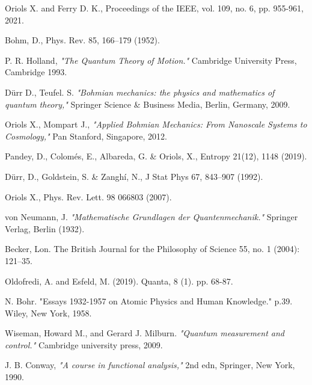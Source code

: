 \documentclass[11pt, a4paper]{article} %
\begin{document}
\newpage
\twocolumn
\begin{thebibliography}{1}
{\footnotesize 

Oriols X. and Ferry D. K., Proceedings of the IEEE, vol. 109, no. 6, pp. 955-961, 2021.

Bohm, D., Phys. Rev. 85, 166–179 (1952).

P. R. Holland, {\em "The Quantum Theory of Motion."} Cambridge University Press, Cambridge 1993.

Dürr D., Teufel. S. {\em "Bohmian mechanics: the physics and mathematics of quantum theory,"} Springer Science \& Business Media, Berlin, Germany, 2009.

	Oriols X., Mompart J., {\em "Applied Bohmian Mechanics: From Nanoscale Systems to Cosmology,"} Pan Stanford, Singapore, 2012.
	
Pandey, D., Colomés, E., Albareda, G. \& Oriols, X., Entropy 21(12), 1148 (2019).

Dürr, D., Goldstein, S. \& Zanghí, N., J Stat Phys 67, 843–907 (1992).

Oriols X., Phys. Rev. Lett. 98 066803 (2007).


von Neumann, J. {\em "Mathematische Grundlagen der Quantenmechanik."} Springer Verlag, Berlin (1932).

Becker, Lon. The British Journal for the Philosophy of Science 55, no. 1 (2004): 121–35.

Oldofredi, A. and Esfeld, M. (2019). Quanta, 8 (1). pp. 68-87.

N. Bohr. {"Essays 1932-1957 on Atomic Physics and Human Knowledge."} p.39. Wiley, New York, 1958.

Wiseman, Howard M., and Gerard J. Milburn. {\em "Quantum measurement and control."} Cambridge university press, 2009.

J. B. Conway, {\em "A course in functional analysis,"} 2nd edn, Springer, New York, 1990.

}
\end{thebibliography}
\end{document}
